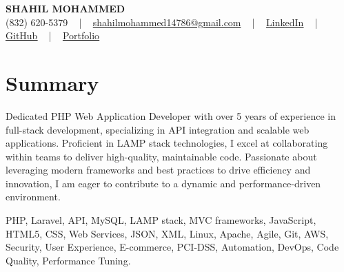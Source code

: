 \documentclass[letterpaper,10pt]{article}
\begin{document}
\begin{center}
    {\fontsize{14pt}{12pt}\selectfont \textbf{\MakeUppercase{Shahil Mohammed}}}\\ \vspace{2pt}
    \fontsize{10pt}{12pt}\selectfont (832) 620-5379 ~ | ~ \href{mailto:shahilmohammed14786@gmail.com}{shahilmohammed14786@gmail.com} ~ | ~  
    \href{https://www.linkedin.com/in/shahil-mohammed-9652931a1/}{\color{blue}\underline{LinkedIn}}  ~ | ~ 
    \href{https://github.com/freakbeast14}{\color{blue}\underline{GitHub}} ~ | ~ 
    \href{https://shahil-mohammed.netlify.app/}{\color{blue}\underline{Portfolio}}
    \vspace{-8pt}
\end{center}

\section{Summary}
\vspace{-2pt}\fontsize{8pt}{9pt}\selectfont
Dedicated PHP Web Application Developer with over 5 years of experience in full-stack development, specializing in API integration and scalable web applications. Proficient in LAMP stack technologies, I excel at collaborating within teams to deliver high-quality, maintainable code. Passionate about leveraging modern frameworks and best practices to drive efficiency and innovation, I am eager to contribute to a dynamic and performance-driven environment. 

{\fontsize{1pt}{1pt}\selectfont\color{white}
PHP, Laravel, API, MySQL, LAMP stack, MVC frameworks, JavaScript, HTML5, CSS, Web Services, JSON, XML, Linux, Apache, Agile, Git, AWS, Security, User Experience, E-commerce, PCI-DSS, Automation, DevOps, Code Quality, Performance Tuning.
}
\vspace{-8pt}

\vspace{-2pt}
\end{document}
